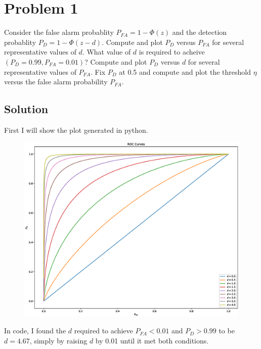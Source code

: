 \documentclass[a4paper]{article}
\begin{document}
\section*{Problem 1}%
Consider the false alarm probablity $P_{FA} = 1 - \Phi(z)$ and the detection probablity $P_D = 1 - \Phi(z-d)$. Compute and plot $P_D$ versus $P_{FA}$ for several representative values of $d$. What value of $d$ is required to acheive $(P_D = 0.99, P_{FA} = 0.01)$? Compute and plot $P_D$ versus $d$ for several representative values of $P_{FA}$. Fix $P_D$ at 0.5 and compute and plot the threshold $\eta$ versus the false alarm probability $P_{FA}$.

\subsection*{Solution}%
First I will show the plot generated in python. 

\begin{figure}[H]
\begin{center}
  \includegraphics[scale=0.4]{hw5-1-1.eps}
\end{center}
\end{figure}

In code, I found the $d$ required to achieve $P_{FA} < 0.01$ and $P_{D} > 0.99$ to be $d = 4.67$, simply by raising $d$ by 0.01 until it met both conditions. 
\end{document}
